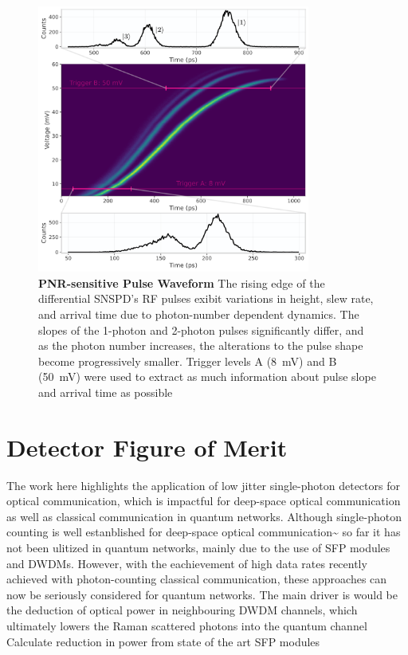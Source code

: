 \documentclass[11pt]{caltech_thesis} %
\begin{document}
\hypertarget{fig:waveform}{%
\begin{figure}
\centering
\includegraphics[width=0.8\textwidth,height=\textheight]{chapter_03/figs_03/waveform_light.pdf}
\caption[{PNR-sensitive Pulse Waveform}]{\textbf{PNR-sensitive Pulse
Waveform} The rising edge of the differential SNSPD's RF pulses exibit
variations in height, slew rate, and arrival time due to photon-number
dependent dynamics. The slopes of the 1-photon and 2-photon pulses
significantly differ, and as the photon number increases, the
alterations to the pulse shape become progressively smaller. Trigger
levels A (8~mV) and B (50~mV) were used to extract as much information
about pulse slope and arrival time as possible}
\label{fig:waveform}
\end{figure}
}

\hypertarget{detector-figure-of-merit-1}{%
\section{Detector Figure of Merit}\label{detector-figure-of-merit-1}}

The work here highlights the application of low jitter single-photon
detectors for optical communication, which is impactful for deep-space
optical communication as well as classical communication in quantum
networks. Although single-photon counting is well estanblished for
deep-space optical
communication\textasciitilde{}\cite{Laser lunar, DSOC} so far it has not
been ulitized in quantum networks, mainly due to the use of SFP modules
and DWDMs. However, with the eachievement of high data rates recently
achieved with photon-counting classical communication, these approaches
can now be seriously considered for quantum networks. The main driver is
would be the deduction of optical power in neighbouring DWDM channels,
which ultimately lowers the Raman scattered photons into the quantum
channel \autocite{EraerdsRaman} {Calculate reduction in power from state
of the art SFP modules}
\end{document}
